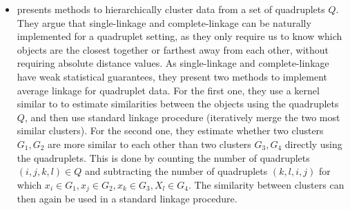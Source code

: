 \begin{itemize}
    \item %
        \cite{kleindessnerKernelFunctionsBased2017} presents methods to hierarchically cluster data from a set of quadruplets $Q$. They argue that single-linkage and complete-linkage can be
        naturally implemented for a quadruplet setting, as they only require us to know which objects are the closest together or farthest away from each other, without requiring
        absolute distance values. As single-linkage and complete-linkage have weak statistical guarantees, they present two methods to implement average linkage for quadruplet data. 
        For the first one, they use a kernel similar to \cite{kleindessnerKernelFunctionsBased2017} to estimate similarities between the objects using the quadruplets $Q$, and then use standard
        linkage procedure (iteratively merge the two most similar clusters). For the second one, they estimate whether two clusters $G_1, G_2$ are more similar to each other than two clusters $G_3, G_4$ directly using the quadruplets. This is done
        by counting the number of quadruplets $(i,j,k,l) \in Q$ and subtracting the number of quadruplets $(k, l, i, j)$ for which $x_i \in G_1, x_j \in G_2, x_k \in G_3, X_l \in G_4$. 
        The similarity between clusters can then again be used in a standard linkage procedure.

\end{itemize}


